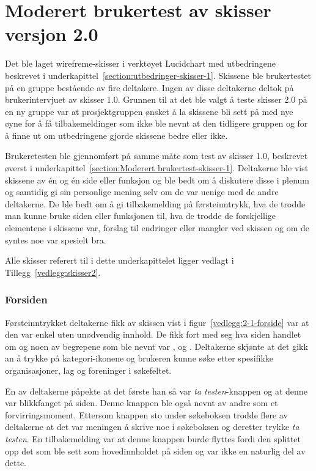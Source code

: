 \section{Moderert brukertest av skisser versjon 2.0}
\label{section:brukertest-skisser2.0}
 
Det ble laget wirefreme-skisser i verktøyet Lucidchart med utbedringene beskrevet i underkapittel~\ref{section:utbedringer-skisser-1}. Skissene ble brukertestet på en gruppe bestående av fire deltakere. Ingen av disse deltakerne deltok på brukerintervjuet av skisser 1.0. Grunnen til at det ble valgt å teste skisser 2.0 på en ny gruppe var at prosjektgruppen ønsket å la skissene bli sett på med nye øyne for å få tilbakemeldinger som ikke ble nevnt at den tidligere gruppen og for å finne ut om utbedringene gjorde skissene bedre eller ikke.


Brukeretesten ble gjennomført på samme måte som test av skisser 1.0, beskrevet øverst i  underkapittel~\ref{section:Moderert brukertest-skisser-1}. Deltakerne ble vist skissene av én og én side eller funksjon og ble bedt om å diskutere disse i plenum og samtidig gi sin personlige mening selv om de var uenige med de andre deltakerne. De ble bedt om å gi tilbakemelding på førsteinntrykk, hva de trodde man kunne bruke siden eller funksjonen til, hva de trodde de forskjellige elementene i skissene var, forslag til endringer eller mangler ved skissen og om de syntes noe var spesielt bra.

Alle skisser referert til i dette underkapittelet ligger vedlagt i Tillegg~\ref{vedlegg:skisser2}.

\subsubsection{Forsiden}
\label{section:test-forside-2.0}

Førsteinntrykket deltakerne fikk av skissen vist i figur~\ref{vedlegg:2-1-forside} 
var at den var enkel uten unødvendig innhold. De fikk fort med seg hva siden handlet om og noen av begrepene som ble nevnt var ,  og . Deltakerne skjønte at det gikk an å trykke på kategori-ikonene og brukeren kunne søke etter spesifikke organisasjoner, lag og foreninger i søkefeltet.

En av deltakerne påpekte at det første han så var {\em  ta testen}-knappen og at denne var blikkfanget på siden. Denne knappen ble også nevnt av andre som et forvirringsmoment. Ettersom knappen sto under søkeboksen trodde flere av deltakerne at det var meningen å skrive noe i søkeboksen og deretter trykke {\em  ta testen}. En tilbakemelding var at denne knappen burde flyttes fordi den splittet opp det som ble sett som hovedinnholdet på siden og var ikke en naturlig del av dette.

